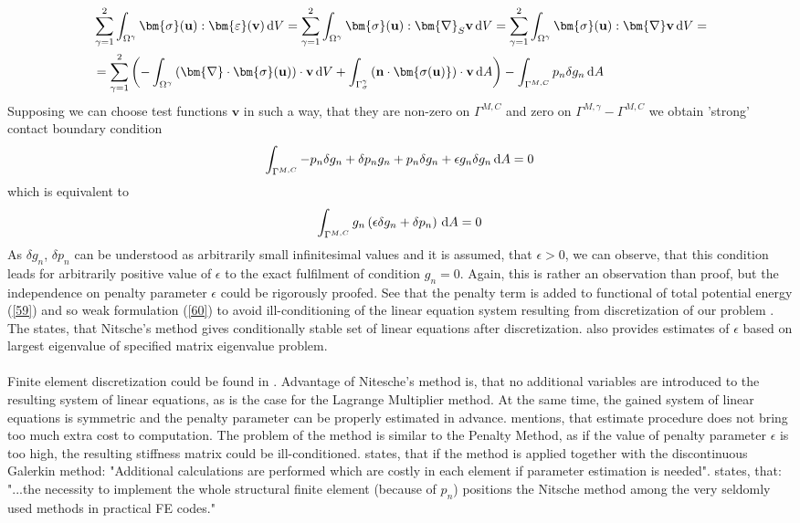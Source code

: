 \documentclass{article}
\newcommand{\beq}{\begin{equation}}
\newcommand{\eeq}{\end{equation}}
\newcommand{\bea}{\begin{eqnarray}}
\newcommand{\eea}{\end{eqnarray}}
\newcommand{\dd}{\,{\rm d}}
\begin{document}
\bea\label{62}
\begin{aligned}
&\sum^{2}_{\gamma = 1}\int_{\Omega^{\gamma}} \bm{\sigma}(\mathbf{u}) : \bm{\varepsilon}(\mathbf{v}) \dd V = \sum^{2}_{\gamma = 1}\int_{\Omega^{\gamma}} \bm{\sigma}(\mathbf{u}) : \bm{\nabla}_{S}\mathbf{v} \dd V =\sum^{2}_{\gamma = 1}\int_{\Omega^{\gamma}} \bm{\sigma}(\mathbf{u}) : \bm{\nabla}\mathbf{v} \dd V =
\\
&=\sum^{2}_{\gamma = 1}\left(-\int_{\Omega^{\gamma}}\left(\bm{\nabla}\cdot\bm{\sigma}(\mathbf{u})\right) \cdot \mathbf{v} \dd V + \int_{\Gamma^{\gamma}_{\sigma}} \left(\mathbf{n}\cdot\bm{\sigma(\mathbf{u})} \right)\cdot\mathbf{v}\dd A\right)-\int_{\Gamma^{M,C}} p_{n} \delta g_{n} \dd A
\end{aligned}
\eea 
Supposing we can choose test functions $\mathbf{v}$ in such a way, that they are non-zero on $ \Gamma^{M,C} $ and zero on $ \Gamma^{M,\gamma}-\Gamma^{M,C} $ we obtain 'strong' contact boundary condition
\beq\label{63}
\int_{\Gamma^{M,C}} -p_{n} \delta g_{n} +\delta p_{n} g_{n}+ p_{n} \delta g_{n}+\epsilon g_{n} \delta g_{n} \dd A = 0
\eeq
which is equivalent to    
\beq\label{64}
\int_{\Gamma^{M,C}} g_{n}\left(\epsilon  \delta g_{n}+\delta p_{n}\right) \dd A = 0
\eeq 
As $ \delta g_{n} $, $ \delta p_{n} $ can be understood as arbitrarily small infinitesimal values and it is assumed, that $\epsilon > 0$, we can observe, that this condition leads for arbitrarily positive value of $ \epsilon $ to the exact fulfilment of condition $ g_{n} = 0 $. Again, this is rather an observation than proof, but the independence on penalty parameter $\epsilon $ could be rigorously proofed. See that the penalty term is added to functional of total potential energy  (\ref{59}) and so weak formulation (\ref{60}) to avoid ill-conditioning of the linear equation system resulting from discretization of our problem \cite[Chapter 5, p.106]{Wriggers}. The \cite{Augarde} states, that Nitsche's method gives conditionally stable set of linear equations after discretization. \cite{Augarde} also provides estimates of $\epsilon $ based on largest eigenvalue of specified matrix eigenvalue problem. 
\\
\\
Finite element discretization could be found in \cite[Chapter 7, p.194-198]{Wriggers}. Advantage of Nitesche's method is, that no additional variables are introduced to the resulting system of linear equations, as is the case for the Lagrange Multiplier method. At the same time, the gained system of linear equations is symmetric and the penalty parameter can be properly estimated in advance. \cite{Augarde} mentions, that estimate procedure does not bring too much extra cost to computation. The problem of the method is similar to the Penalty Method, as if the value of penalty parameter $\epsilon$ is too high, the resulting stiffness matrix could be ill-conditioned. \cite{Augarde} states, that if the method is applied together with the discontinuous Galerkin method: "Additional calculations are performed which are costly in each element if parameter estimation is needed". \cite[Chapter 6, p.83]{Izi} states, that: "...the necessity to implement the whole structural finite element (because of $p_{n}$) positions the Nitsche method among the very seldomly used methods in practical FE codes."  
\end{document}
